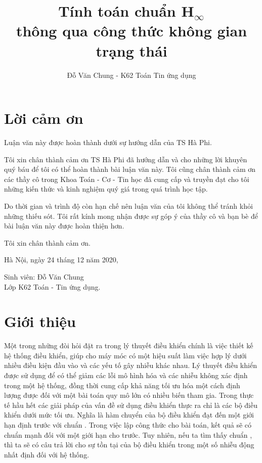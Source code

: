 \documentclass[12pt,a4paper]{article}
\title{\textbf{Tính toán chuẩn H$_\infty$ \\ thông qua công thức không gian trạng thái}}
\author{Đỗ Văn Chung - K62 Toán Tin ứng dụng}
\date{}
\theoremstyle{definition}
\newcommand{\hinf}{\text{\emph{H$_\infty$ }}}
\begin{document}


\thispagestyle{plain}
\vspace*{2cm}
\section*{\LARGE{Lời cảm ơn}}
\vspace*{1cm}

Luận văn này được hoàn thành dưới sự hướng dẫn của TS Hà Phi.

\medskip
Tôi xin chân thành cảm ơn TS Hà Phi đã hướng dẫn và cho những lời khuyên quý báu để tôi có thể hoàn thành bài luận văn này. Tôi cũng chân thành cảm ơn các thầy cô trong Khoa Toán - Cơ - Tin học đã cung cấp và truyền đạt cho tôi những kiến thức và kinh nghiệm quý giá trong quá trình học tập.

\medskip
Do thời gian và trình độ còn hạn chế nên luận văn của tôi không thể tránh khỏi những thiếu sót. Tôi rất kính mong nhận được sự góp ý của thầy cô và bạn bè để bài luận văn này được hoàn thiện hơn. 

\medskip
Tôi xin chân thành cảm ơn.

\vspace*{1cm}
Hà Nội, ngày 24 tháng 12 năm 2020,

\medskip
Sinh viên: Đỗ Văn Chung \\
Lớp K62 Toán - Tin ứng dụng.

\newpage
\vspace*{2cm}
\tableofcontents

\newpage	

\maketitle


\section{Giới thiệu}
Một trong những đòi hỏi đặt ra trong lý thuyết điều khiển chính là việc thiết kế hệ thống điều khiển, giúp cho máy móc có một hiệu suất làm việc hợp lý dưới nhiều điều kiện đầu vào và các yếu tố gây nhiễu khác nhau. Lý thuyết điều khiển \hinf  được sử dụng để có thể giảm các lỗi mô hình hóa và các nhiễu không xác định trong một hệ thống, đồng thời cung cấp khả năng tối ưu hóa một cách định lượng được đối với một bài toán quy mô lớn có nhiều biến tham gia. Trong thực tế hầu hết các giải pháp của vấn đề sử dụng điều khiển \hinf  thực ra chỉ là các bộ điều khiển dưới mức tối ưu. Nghĩa là hàm chuyển của bộ điều khiển đạt đến một giới hạn định trước với chuẩn \hinf. Trong việc lập công thức cho bài toán, kết quả sẽ có chuẩn mạnh đối với một giới hạn cho trước. Tuy nhiên, nếu ta tìm thấy chuẩn \hinf , thì ta sẽ có câu trả lời cho sự tồn tại của bộ điều khiển trong một số nhiễu động nhất định đối với hệ thống.
\end{document}
